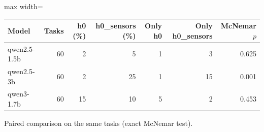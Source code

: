{\small
\begin{adjustbox}{max width=\linewidth}
\begin{tabular}{l r r r r r r}
\toprule
Model & Tasks & h0 (\%) & h0\_sensors (\%) & Only h0 & Only h0\_sensors & McNemar $p$ \\
\midrule
qwen2.5-1.5b & 60 & 2 & 5 & 1 & 3 & 0.625 \\
qwen2.5-3b & 60 & 2 & 25 & 1 & 15 & 0.001 \\
qwen3-1.7b & 60 & 15 & 10 & 5 & 2 & 0.453 \\
\bottomrule
\end{tabular}
\end{adjustbox}

\smallskip
{\footnotesize Paired comparison on the same tasks (exact McNemar test).\par}
}
